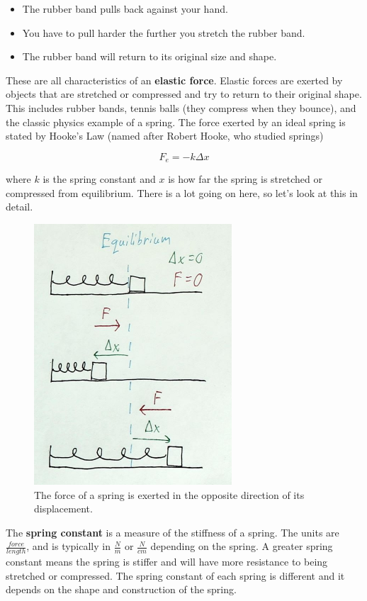 \documentclass[12pt]{book}
\begin{document}
\begin{itemize}
\item The rubber band pulls back against your hand.
\item You have to pull harder the further you stretch the rubber band.
\item The rubber band will return to its original size and shape.
\end{itemize}

These are all characteristics of an \textbf{elastic force}. Elastic forces are exerted by objects that are stretched or compressed and try to return to their original shape. This includes rubber bands, tennis balls (they compress when they bounce), and the classic physics example of a spring. The force exerted by an ideal spring is stated by Hooke's Law (named after Robert Hooke, who studied springs)

\begin{equation}
F_e = -k \Delta x
\label{hooke}
\end{equation}

where $k$ is the spring constant and $x$ is how far the spring is stretched or compressed from equilibrium. There is a lot going on here, so let's look at this in detail.

\begin{figure}[H]
\centering
\includegraphics[scale=0.7]{spring_intro.png}
\caption{The force of a spring is exerted in the opposite direction of its displacement.}
\label{springintro}
\end{figure}

The \textbf{spring constant} is a measure of the stiffness of a spring. The units are $\frac{force}{length}$, and is typically in $\frac{N}{m}$ or $\frac{N}{cm}$ depending on the spring. A greater spring constant means the spring is stiffer and will have more resistance to being stretched or compressed. The spring constant of each spring is different and it depends on the shape and construction of the spring.
\end{document}

